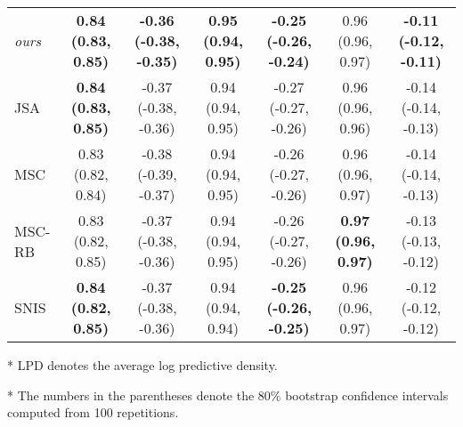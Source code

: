 \begin{table*}
\begin{threeparttable}
\begin{tabular}{lcccccc}
    \textit{ours} & \textbf{0.84 {\scriptsize(0.83, 0.85)}} & \textbf{-0.36 {\scriptsize(-0.38, -0.35)}} & \textbf{0.95 {\scriptsize(0.94, 0.95)}} & \textbf{-0.25 {\scriptsize(-0.26, -0.24)}} & 0.96 {\scriptsize(0.96, 0.97)} & \textbf{-0.11 {\scriptsize(-0.12, -0.11)}} \\
    JSA & \textbf{0.84 {\scriptsize(0.83, 0.85)}} & -0.37 {\scriptsize(-0.38, -0.36)} & 0.94 {\scriptsize(0.94, 0.95)} & -0.27 {\scriptsize(-0.27, -0.26)} & 0.96 {\scriptsize(0.96, 0.96)} & -0.14 {\scriptsize(-0.14, -0.13)} \\
    MSC & 0.83 {\scriptsize(0.82, 0.84)} & -0.38 {\scriptsize(-0.39, -0.37)} & 0.94 {\scriptsize(0.94, 0.95)} & -0.26 {\scriptsize(-0.27, -0.26)} & 0.96 {\scriptsize(0.96, 0.97)} & -0.14 {\scriptsize(-0.14, -0.13)} \\
    MSC-RB & 0.83 {\scriptsize(0.82, 0.85)} & -0.37 {\scriptsize(-0.38, -0.36)} & 0.94 {\scriptsize(0.94, 0.95)} & -0.26 {\scriptsize(-0.27, -0.26)} & \textbf{0.97 {\scriptsize(0.96, 0.97)}} & -0.13 {\scriptsize(-0.13, -0.12)} \\
    SNIS & \textbf{0.84 {\scriptsize(0.82, 0.85)}} & -0.37 {\scriptsize(-0.38, -0.36)} & 0.94 {\scriptsize(0.94, 0.94)} & \textbf{-0.25 {\scriptsize(-0.26, -0.25)}} & 0.96 {\scriptsize(0.96, 0.97)} & -0.12 {\scriptsize(-0.12, -0.12)} \\\bottomrule
  \end{tabular}
  \begin{tablenotes}
    \item[*]{\footnotesize LPD denotes the average log predictive density.}
    \item[*]{\footnotesize The numbers in the parentheses denote the 80\% bootstrap confidence intervals computed from 100 repetitions.}
  \end{tablenotes}
  \end{threeparttable}
  \vspace{-0.15in}
\end{table*}

